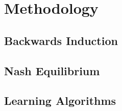 \section{Methodology}

\subsection{Backwards Induction}

\subsection{Nash Equilibrium}

\subsection{Learning Algorithms}
